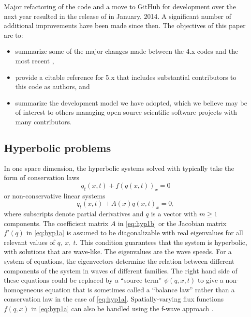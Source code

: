 Major refactoring of the code and a move to GitHub for development over the
next year resulted in the release of  in January, 2014. 
A significant number of additional improvements have been made since then.  The
objectives of this paper are to:
\begin{itemize} 
\item summarize some of the major changes made between the \clawpack
4.x codes and the most recent ,
\item provide a citable reference for \clawpack 5.x that includes
substantial contributors to this code as authors, and
\item summarize the development model we have adopted, which we believe
may be of interest to others managing open source scientific software
projects with many contributors.
\end{itemize} 

\subsection{Hyperbolic problems}\label{sec:hyp}

In one space dimension, the hyperbolic systems solved with
\clawpack typically take the form of conservation laws
\begin{equation}\label{eq:hyp1a}
q_t(x,t) + f(q(x,t))_x = 0
\end{equation}
or non-conservative linear systems
\begin{equation}\label{eq:hyp1b}
q_t(x,t) + A(x) q(x,t)_x = 0,
\end{equation} 
where subscripts denote partial derivatives and
$q$ is a vector with $m\ge 1$ components.
The coefficient matrix $A$ in \cref{eq:hyp1b} or the Jacobian matrix 
$f'(q)$ in \cref{eq:hyp1a} is assumed to be diagonalizable with real eigenvalues
for all relevant values of $q,~x,~t$. 
This condition
guarantees that the system is hyperbolic, with solutions that are wave-like.  
The eigenvalues are the wave speeds.  For a system of equations,
the eigenvectors determine the relation between different components of the
system in waves of different families.  The right hand side of these
equations could be replaced by a ``source term'' $\psi(q,x,t)$ to give a
non-homogeneous equation that is sometimes called a ``balance law'' rather
than a conservation law in the case of \cref{eq:hyp1a}.
Spatially-varying flux functions $f(q,x)$ in \cref{eq:hyp1a} can also be handled
using the f-wave approach \cite{db-rjl-sm-jr:vcflux}.

